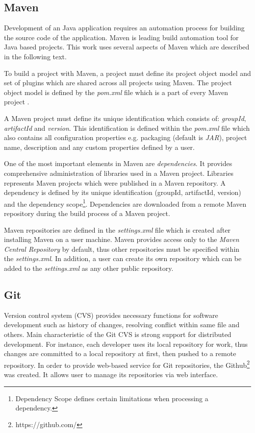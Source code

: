 \documentclass[12pt,oneside]{fithesis2}
\begin{document}
\subsection{Maven}
Development of an Java application requires an automation process for building the source code of the application. Maven is leading build automation tool for Java based projects. This work uses several aspects of Maven which are described in the following text.

To build a project with Maven, a project must define its project object model and set of plugins which are shared across all projects using Maven. The project object model is defined by the \textit{pom.xml} file which is a part of every Maven project \cite{maven_doc}. 

A Maven project must define its unique identification which consists of: \textit{groupId}, \textit{artifactId} and \textit{version}. This identification is defined within the \textit{pom.xml} file which also contains all configuration properties e.g. packaging (default is \textit{JAR}), project name, description and any custom properties defined by a user.

One of the most important elements in Maven are \textit{dependencies}. It provides comprehensive administration of libraries used in a Maven project. Libraries represents Maven projects which were published in a Maven repository. A dependency is defined by its unique identification (groupId, artifactId, version) and the dependency scope\footnote{Dependency Scope defines certain limitations when processing a dependency.}. Dependencies are downloaded from a remote Maven repository during the build process of a Maven project.

Maven repositories are defined in the \textit{settings.xml} file which is created after installing Maven on a user machine. Maven provides access only to the \textit{Maven Central Repository} by default, thus other repositories must be specified within the \textit{settings.xml}. In addition, a user can create its own repository which can be added to the \textit{settings.xml} as any other public repository.

\subsection{Git}
Version control system (CVS) provides necessary functions for software development such as history of changes, resolving conflict within same file and others. Main characteristic of the Git CVS is strong support for distributed development. For instance, each developer uses its local repository for work, thus changes are committed to a local repository at first, then pushed to a remote repository. In order to provide web-based service for Git repositories, the Github\footnote{https://github.com/} was created. It allows user to manage its repositories via web interface.
\end{document}
